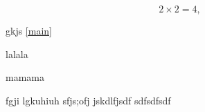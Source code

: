 \documentclass[12pt,a4paper]{report}
\begin{document}





\begin{equation}
2\times 2=4,\label{main}
\end{equation}

gkjs \ref{main}


\begin{sqlist}
\item lalala
\item mamama
\end{sqlist}

fgji \citep{ER89} lgkuhiuh \citep{Adakudlu12} 
sfjs;ofj
jskdlfjsdf
sdfsdfsdf \citep{dierer2005}



\end{document}
